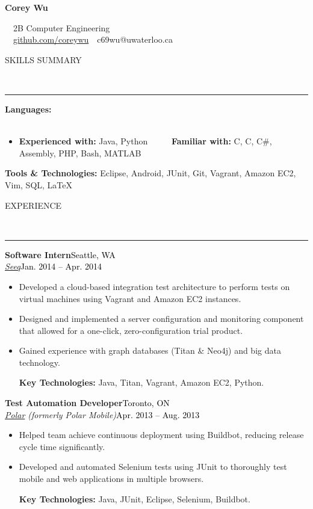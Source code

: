 \documentclass[11pt, letterpaper, oneside]{article}
\makeatletter
\newcommand{\name}{Corey Wu}
\newcommand{\program}{2B Computer Engineering}
\newcommand{\github}{\href{https://github.com/coreywu}{github.com/coreywu}}
\newcommand{\email}{c69wu@uwaterloo.ca}
\newcommand{\HRule}[2]{\textcolor{#1}{\rule{\linewidth}{#2}}}
\newcommand{\sectiontitle}[1]{\begin{minipage}{\textwidth}\vspace{-7.5pt}\begin{flushleft}\hspace{-20.5pt}\vspace{-25pt}
\Large\MakeUppercase{#1}\end{flushleft}\end{minipage}\\\HRule{black}{0.15mm}\vspace{\baselineskip}}
\newenvironment{ressection}[1]{
  \sectiontitle{#1}}
  {\vspace{-\baselineskip}}
\newcommand{\resentryheader}[4]{
    \vspace{-6pt}
    \textbf{#1}\hspace{\stretch{1}}\textcolor{black}{#3}\\
    \textit{#2}\hspace{\stretch{1}}\textcolor{black}{#4}\\
}
\newcommand{\resitem}[1]{
    \vspace{2pt}
    \item \begin{flushleft} #1 \end{flushleft}
}
\newcommand{\CPP}
{C\nolinebreak[4]\hspace{-.05em}\raisebox{.22ex}{\footnotesize\bf ++}}
\newenvironment{resentry}[4]{
  \begin{minipage}{\textwidth}
  \vspace{-3pt}
    \resentryheader{#1}{#2}{#3}{#4}
        \vspace{-\baselineskip}
    \begin{itemize}[noitemsep,nolistsep]
}{
    \end{itemize}
        \vspace{\baselineskip}
        \end{minipage}
}
\makeatother
\begin{document}
\begin{center}
	{\Huge \textbf{\name}}

	\ \ {\Large{\program}} \\
	\ \ \github \ \textbullet \ \email \ \
\end{center}

\vspace{-20pt}

\begin{ressection}{Skills Summary}
\begin{resentry}{Languages:}{}{}{}{}
\vspace{-16pt}
\resitem{\textbf{Experienced with:} Java, Python \ \ \ \ \textbullet \ \textbf{Familiar with:} C, \CPP, C\#, Assembly, PHP, Bash, MATLAB}
\vspace{-10pt}
\end{resentry}
\textbf{Tools \& Technologies:} Eclipse, Android, JUnit,  Git, Vagrant, Amazon EC2, Vim, SQL, \LaTeX
\end{ressection}
\vspace{14pt}

\begin{ressection}{Experience}
  \begin{resentry}{Software Intern}{\href{http://www.seeq.com/}{Seeq}}{Seattle, WA}{Jan. 2014 -- Apr. 2014}
    \resitem{Developed a cloud-based integration test architecture to perform tests on virtual machines using Vagrant and Amazon EC2 instances.}
    \resitem{Designed and implemented a server configuration and monitoring component that allowed for a one-click, zero-configuration trial product. }
    \resitem{Gained experience with graph databases (Titan \& Neo4j) and big data technology.}
    \vspace{4pt} \hspace{-15pt}
    \textbf{Key Technologies:} Java, Titan, Vagrant, Amazon EC2, Python.
  \end{resentry}
  \begin{resentry}{Test Automation Developer}{\href{http://polar.me/}{Polar} (formerly Polar Mobile)}{Toronto, ON}{Apr. 2013 -- Aug. 2013}
    \resitem{Helped team achieve continuous deployment using Buildbot, reducing release cycle time significantly.}
    \resitem{Developed and automated Selenium tests using JUnit to thoroughly test mobile and web applications in multiple browsers.}
    \vspace{4pt} \hspace{-15pt}
    \textbf{Key Technologies:} Java, JUnit, Eclipse, Selenium, Buildbot.
  \end{resentry}
\end{ressection}
\end{document}
